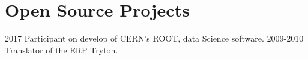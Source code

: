 \section{Open Source Projects}

\begin{entrylist}
  \entry
	{2017}
	{Participant on develop of CERN’s ROOT, data Science software.}
	{}{}
  \entry
        {2009-2010}
	{Translator of the ERP Tryton.}
	{}{}
\end{entrylist}
